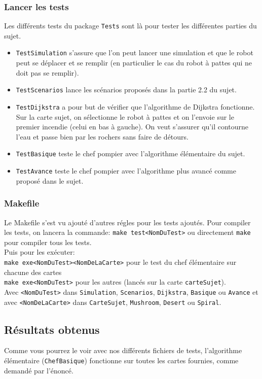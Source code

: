 \documentclass[a4paper,10pt]{article} %
\begin{document}
\subsubsection{Lancer les tests}
Les différents tests du package \texttt{Tests} sont là pour tester les différentes parties du sujet.
\begin{itemize}
    \item \texttt{TestSimulation} s'assure que l'on peut lancer une simulation et que le robot peut se déplacer et se remplir
    (en particulier le cas du robot à pattes qui ne doit pas se remplir).
    \item \texttt{TestScenarios} lance les scénarios proposés dans la partie 2.2 du sujet.
    \item \texttt{TestDijkstra} a pour but de vérifier que l'algorithme de Dijkstra fonctionne. Sur la carte sujet, 
    on sélectionne le robot à pattes et on l'envoie sur le premier incendie (celui en bas à gauche).
    On veut s'assurer qu'il contourne l'eau et passe bien par les rochers sans faire de détours.
    \item \texttt{TestBasique} teste le chef pompier avec l'algorithme élémentaire du sujet.
    \item \texttt{TestAvance} teste le chef pompier avec l'algorithme plus avancé comme proposé dans le sujet.
\end{itemize}

\subsubsection{Makefile}
Le Makefile s'est vu ajouté d'autres régles pour les tests ajoutés.
Pour compiler les tests, on lancera la commande: \texttt{make test<NomDuTest>} ou directement \texttt{make} pour compiler tous les tests. \\

Puis pour les exécuter: \\
\texttt{make exe<NomDuTest><NomDeLaCarte>} pour le test du chef élémentaire sur chacune des cartes\\
\texttt{make exe<NomDuTest>} pour les autres (lancés sur la carte \texttt{carteSujet}).\\

Avec \texttt{<NomDuTest>} dans \texttt{Simulation}, \texttt{Scenarios}, \texttt{Dijkstra}, \texttt{Basique} ou \texttt{Avance} et avec 
\texttt{<NomDeLaCarte>} dans \texttt{CarteSujet}, \texttt{Mushroom}, \texttt{Desert} ou \texttt{Spiral}.

\subsection{Résultats obtenus}
Comme vous pourrez le voir avec nos différents fichiers de tests, l'algorithme élémentaire (\texttt{ChefBasique}) fonctionne sur toutes les cartes 
fournies, comme demandé par l'énoncé.
\end{document}
